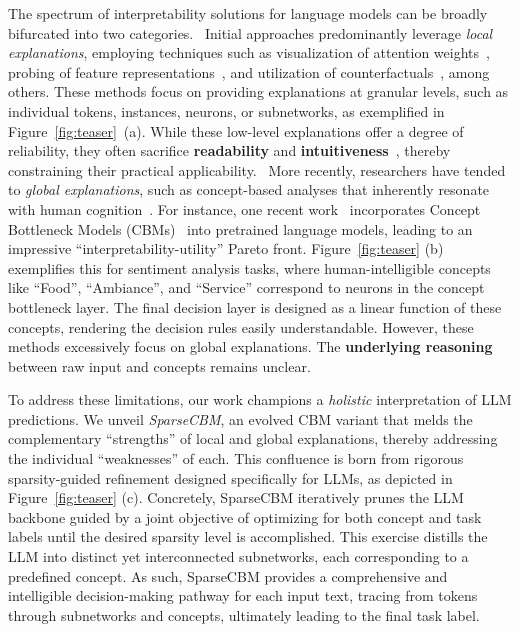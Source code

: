 \documentclass[letterpaper]{article} %
\begin{document}
The spectrum of interpretability solutions for language models can be broadly bifurcated into two categories.
~Initial approaches predominantly leverage \textit{local explanations}, employing techniques such as visualization of attention weights~\cite{galassi2020attention}, probing of feature representations~\cite{mishra2017local,lundberg2017unified}, and utilization of counterfactuals~\cite{wu2021polyjuice,ross2021explaining}, among others.
These methods focus on providing explanations at granular levels, such as individual tokens, instances, neurons, or subnetworks, as exemplified in Figure~\ref{fig:teaser}~(a). While these low-level explanations offer a degree of reliability, they often sacrifice \textbf{readability} and \textbf{intuitiveness}~\citep{losch2019interpretability}, thereby constraining their practical applicability. ~More recently, researchers have tended to \textit{global explanations}, such as concept-based analyses that inherently resonate with human cognition~\citep{wang2023intepreting,abraham2022cebab}. For instance, one recent work~\citep{tan2023cbm} incorporates Concept Bottleneck Models (CBMs)~\citep{koh2020concept} into pretrained language models, leading to an impressive ``interpretability-utility'' Pareto front. Figure~\ref{fig:teaser} (b) exemplifies this for sentiment analysis tasks, where human-intelligible concepts like ``Food'', ``Ambiance'', and ``Service'' correspond to neurons in the concept bottleneck layer. The final decision layer is designed as a linear function of these concepts, rendering the decision rules easily understandable. However, these methods excessively focus on global explanations. The \textbf{underlying reasoning} between raw input and concepts remains unclear.


To address these limitations, our work champions a \textit{holistic} interpretation of LLM predictions. We unveil \textit{SparseCBM}, an evolved CBM variant that melds the complementary ``strengths'' of local and global explanations, thereby addressing the individual ``weaknesses'' of each. This confluence is born from rigorous sparsity-guided refinement designed specifically for LLMs, as depicted in Figure~\ref{fig:teaser} (c). Concretely, SparseCBM iteratively prunes the LLM backbone guided by a joint objective of optimizing for both concept and task labels until the desired sparsity level is accomplished. This exercise distills the LLM into distinct yet interconnected subnetworks, each corresponding to a predefined concept. As such, SparseCBM provides a comprehensive and intelligible decision-making pathway for each input text, tracing from tokens through subnetworks and concepts, ultimately leading to the final task label.
\end{document}
